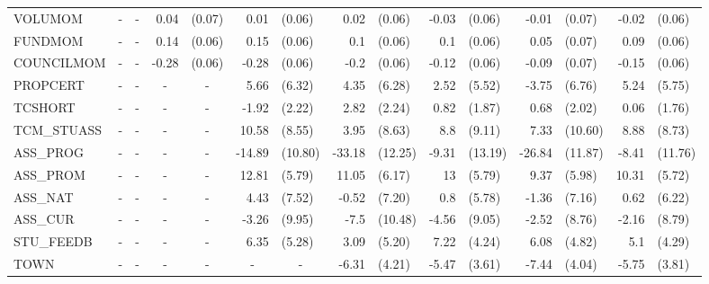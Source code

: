 \documentclass[12pt]{article}%
\begin{document}
\begin{table}[H]
\begin{tabular}{lrlrlrlrlrlrlrl}
			VOLUMOM & \multicolumn{1}{c}{-} & \multicolumn{1}{c}{-} & 0.04  & (0.07) & 0.01  & (0.06) & 0.02  & (0.06) & -0.03 & (0.06) & -0.01 & (0.07) & -0.02 & (0.06) \\[0.2em]
			FUNDMOM & \multicolumn{1}{c}{-} & \multicolumn{1}{c}{-} & 0.14  & (0.06) & 0.15  & (0.06) & 0.1   & (0.06) & 0.1   & (0.06) & 0.05  & (0.07) & 0.09  & (0.06) \\[0.2em]
			COUNCILMOM & \multicolumn{1}{c}{-} & \multicolumn{1}{c}{-} & -0.28 & (0.06) & -0.28 & (0.06) & -0.2  & (0.06) & -0.12 & (0.06) & -0.09 & (0.07) & -0.15 & (0.06) \\[0.2em]
			PROPCERT & \multicolumn{1}{c}{-} & \multicolumn{1}{c}{-} & \multicolumn{1}{c}{-} & \multicolumn{1}{c}{-} & 5.66  & (6.32) & 4.35  & (6.28) & 2.52  & (5.52) & -3.75 & (6.76) & 5.24  & (5.75) \\[0.2em]
			TCSHORT & \multicolumn{1}{c}{-} & \multicolumn{1}{c}{-} & \multicolumn{1}{c}{-} & \multicolumn{1}{c}{-} & -1.92 & (2.22) & 2.82  & (2.24) & 0.82  & (1.87) & 0.68  & (2.02) & 0.06  & (1.76) \\[0.2em]
			TCM\_STUASS & \multicolumn{1}{c}{-} & \multicolumn{1}{c}{-} & \multicolumn{1}{c}{-} & \multicolumn{1}{c}{-} & 10.58 & (8.55) & 3.95  & (8.63) & 8.8   & (9.11) & 7.33  & (10.60) & 8.88  & (8.73) \\[0.2em]
			ASS\_PROG & \multicolumn{1}{c}{-} & \multicolumn{1}{c}{-} & \multicolumn{1}{c}{-} & \multicolumn{1}{c}{-} & -14.89 & (10.80) & -33.18 & (12.25) & -9.31 & (13.19) & -26.84 & (11.87) & -8.41 & (11.76) \\[0.2em]
			ASS\_PROM & \multicolumn{1}{c}{-} & \multicolumn{1}{c}{-} & \multicolumn{1}{c}{-} & \multicolumn{1}{c}{-} & 12.81 & (5.79) & 11.05 & (6.17) & 13    & (5.79) & 9.37  & (5.98) & 10.31 & (5.72) \\[0.2em]
			ASS\_NAT & \multicolumn{1}{c}{-} & \multicolumn{1}{c}{-} & \multicolumn{1}{c}{-} & \multicolumn{1}{c}{-} & 4.43  & (7.52) & -0.52 & (7.20) & 0.8   & (5.78) & -1.36 & (7.16) & 0.62  & (6.22) \\[0.2em]
			ASS\_CUR & \multicolumn{1}{c}{-} & \multicolumn{1}{c}{-} & \multicolumn{1}{c}{-} & \multicolumn{1}{c}{-} & -3.26 & (9.95) & -7.5  & (10.48) & -4.56 & (9.05) & -2.52 & (8.76) & -2.16 & (8.79) \\[0.2em]
			STU\_FEEDB & \multicolumn{1}{c}{-} & \multicolumn{1}{c}{-} & \multicolumn{1}{c}{-} & \multicolumn{1}{c}{-} & 6.35  & (5.28) & 3.09  & (5.20) & 7.22  & (4.24) & 6.08  & (4.82) & 5.1   & (4.29) \\[0.2em]
			TOWN  & \multicolumn{1}{c}{-} & \multicolumn{1}{c}{-} & \multicolumn{1}{c}{-} & \multicolumn{1}{c}{-} & \multicolumn{1}{c}{-} & \multicolumn{1}{c}{-} & -6.31 & (4.21) & -5.47 & (3.61) & -7.44 & (4.04) & -5.75 & (3.81) \\[0.2em]

\end{tabular}
\end{table}
\end{document}
